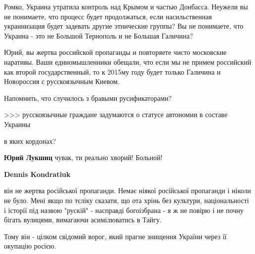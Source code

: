 \begin{itemize}
\begin{itemize}
Ромко, Украина утратила контроль над Крымом и частью Донбасса. Неужели вы не
понимаете, что процесс будет продолжаться, если насильственная украинизация
будет задевать другие этнические группы? Вы не понимаете, что Украина - это не
Большой Тернополь и не Большая Галичина?


 

Юрий, вы жертва российской пропаганды и повторяете чисто московские наративы.
Ваши единомышленники обещали, что если мы не примем российский как второй
государственный, то к 2015му году будет только Галичина и Новороссия с
русскоязычным Киевом.

Напомнить, что случилось з бравыми русификаторами?

 

>>> русскоязычные граждане задумаются о статусе автономии в составе Украины

в яких кордонах?



 
\textbf{Юрий Лукшиц} чувак, ти реально хворий! Больной!

 
\textbf{Dennis Kondratiuk} 

він не жертва російської пропаганди. Немає ніякої російської пропаганди і
ніколи не було. Мені якщо по тєліку сказати, що ота хрінь без культури,
національності і історії під назвою "рускій" - насправді богоізбрана - я ж не
повірю і не почну бігать вулицями, вимагаючи асимілюватись в Тайгу.

Тому він - цілком свідомий ворог, який прагне знищення України через її
окупацію росією.


\end{itemize}
\end{itemize}

